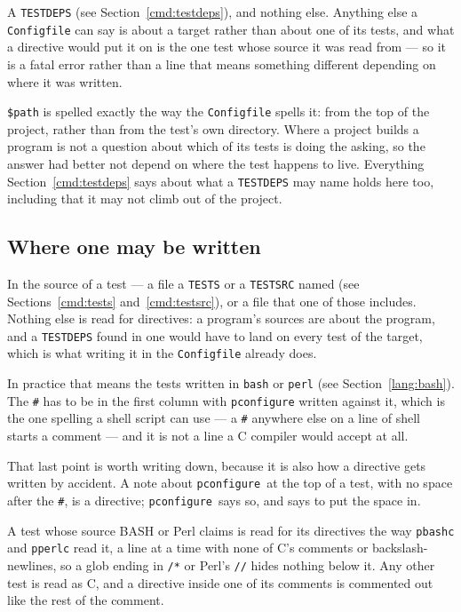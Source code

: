 \documentclass{article}
\newcommand{\pconfigure}{\texttt{pconfigure}}
\begin{document}
A \texttt{TESTDEPS} (see Section~\ref{cmd:testdeps}), and nothing
else.  Anything else a \texttt{Configfile} can say is about a target
rather than about one of its tests, and what a directive would put it
on is the one test whose source it was read from --- so it is a fatal
error rather than a line that means something different depending on
where it was written.

\texttt{\$path} is spelled exactly the way the \texttt{Configfile}
spells it: from the top of the project, rather than from the test's
own directory.  Where a project builds a program is not a question
about which of its tests is doing the asking, so the answer had better
not depend on where the test happens to live.  Everything
Section~\ref{cmd:testdeps} says about what a \texttt{TESTDEPS} may
name holds here too, including that it may not climb out of the
project.

\subsection{Where one may be written}

In the source of a test --- a file a \texttt{TESTS} or a
\texttt{TESTSRC} named (see Sections~\ref{cmd:tests}
and~\ref{cmd:testsrc}), or a file that one of those includes.  Nothing
else is read for directives: a program's sources are about the
program, and a \texttt{TESTDEPS} found in one would have to land on
every test of the target, which is what writing it in the
\texttt{Configfile} already does.

In practice that means the tests written in \texttt{bash} or
\texttt{perl} (see Section~\ref{lang:bash}).  The \texttt{\#} has to
be in the first column with \texttt{pconfigure} written against it,
which is the one spelling a shell script can use --- a \texttt{\#}
anywhere else on a line of shell starts a comment --- and it is not a
line a C compiler would accept at all.

That last point is worth writing down, because it is also how a
directive gets written by accident.  A note about \pconfigure\ at the
top of a test, with no space after the \texttt{\#}, is a directive;
\pconfigure\ says so, and says to put the space in.

A test whose source BASH or Perl claims is read for its directives
the way \texttt{pbashc} and \texttt{pperlc} read it, a line at a
time with none of C's comments or backslash-newlines, so a glob ending
in \texttt{/*} or Perl's \texttt{//} hides nothing below it.  Any
other test is read as C, and a directive inside one of its comments is
commented out like the rest of the comment.
\end{document}
